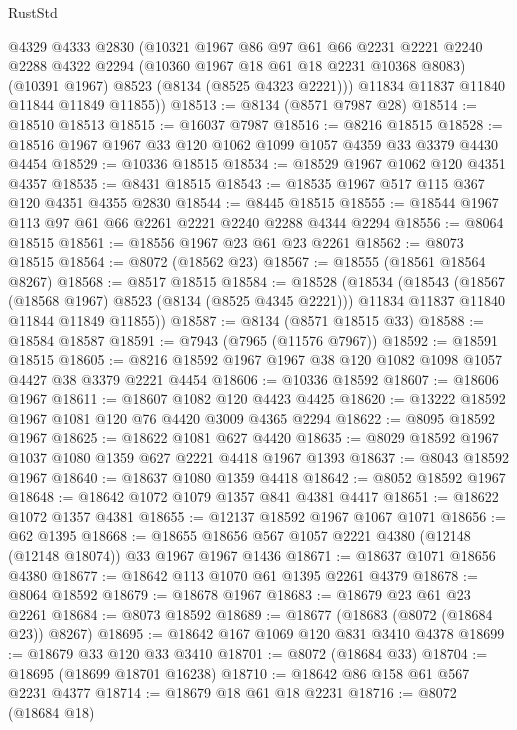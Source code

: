\begin{lexlean}{RustStd}
\begin{coremodule}
        @4329
        @4333
        @2830
        (@10321
          @1967
          @86
          @97
          @61
          @66
          @2231
          @2221
          @2240
          @2288
          @4322
          @2294
          (@10360 @1967 @18 @61 @18 @2231 @10368 @8083)
          (@10391 @1967)
          @8523
          (@8134 (@8525 @4323 @2221)))
        @11834
        @11837
        @11840
        @11844
        @11849
        @11855))
@18513 := @8134 (@8571 @7987 @28)
@18514 := @18510 @18513
@18515 := @16037 @7987
@18516 := @8216 @18515
@18528 := @18516 @1967 @1967 @33 @120 @1062 @1099 @1057 @4359 @33 @3379 @4430 @4454
@18529 := @10336 @18515
@18534 := @18529 @1967 @1062 @120 @4351 @4357
@18535 := @8431 @18515
@18543 := @18535 @1967 @517 @115 @367 @120 @4351 @4355 @2830
@18544 := @8445 @18515
@18555 := @18544 @1967 @113 @97 @61 @66 @2261 @2221 @2240 @2288 @4344 @2294
@18556 := @8064 @18515
@18561 := @18556 @1967 @23 @61 @23 @2261
@18562 := @8073 @18515
@18564 := @8072 (@18562 @23)
@18567 := @18555 (@18561 @18564 @8267)
@18568 := @8517 @18515
@18584 := @18528
    (@18534
      (@18543
        (@18567 (@18568 @1967) @8523 (@8134 (@8525 @4345 @2221)))
        @11834
        @11837
        @11840
        @11844
        @11849
        @11855))
@18587 := @8134 (@8571 @18515 @33)
@18588 := @18584 @18587
@18591 := @7943 (@7965 (@11576 @7967))
@18592 := @18591 @18515
@18605 := @8216 @18592 @1967 @1967 @38 @120 @1082 @1098 @1057 @4427 @38 @3379 @2221 @4454
@18606 := @10336 @18592
@18607 := @18606 @1967
@18611 := @18607 @1082 @120 @4423 @4425
@18620 := @13222 @18592 @1967 @1081 @120 @76 @4420 @3009 @4365 @2294
@18622 := @8095 @18592 @1967
@18625 := @18622 @1081 @627 @4420
@18635 := @8029 @18592 @1967 @1037 @1080 @1359 @627 @2221 @4418 @1967 @1393
@18637 := @8043 @18592 @1967
@18640 := @18637 @1080 @1359 @4418
@18642 := @8052 @18592 @1967
@18648 := @18642 @1072 @1079 @1357 @841 @4381 @4417
@18651 := @18622 @1072 @1357 @4381
@18655 := @12137 @18592 @1967 @1067 @1071
@18656 := @62 @1395
@18668 := @18655 @18656 @567 @1057 @2221 @4380 (@12148 (@12148 @18074)) @33 @1967 @1967 @1436
@18671 := @18637 @1071 @18656 @4380
@18677 := @18642 @113 @1070 @61 @1395 @2261 @4379
@18678 := @8064 @18592
@18679 := @18678 @1967
@18683 := @18679 @23 @61 @23 @2261
@18684 := @8073 @18592
@18689 := @18677 (@18683 (@8072 (@18684 @23)) @8267)
@18695 := @18642 @167 @1069 @120 @831 @3410 @4378
@18699 := @18679 @33 @120 @33 @3410
@18701 := @8072 (@18684 @33)
@18704 := @18695 (@18699 @18701 @16238)
@18710 := @18642 @86 @158 @61 @567 @2231 @4377
@18714 := @18679 @18 @61 @18 @2231
@18716 := @8072 (@18684 @18)

\end{coremodule}
\end{lexlean}
